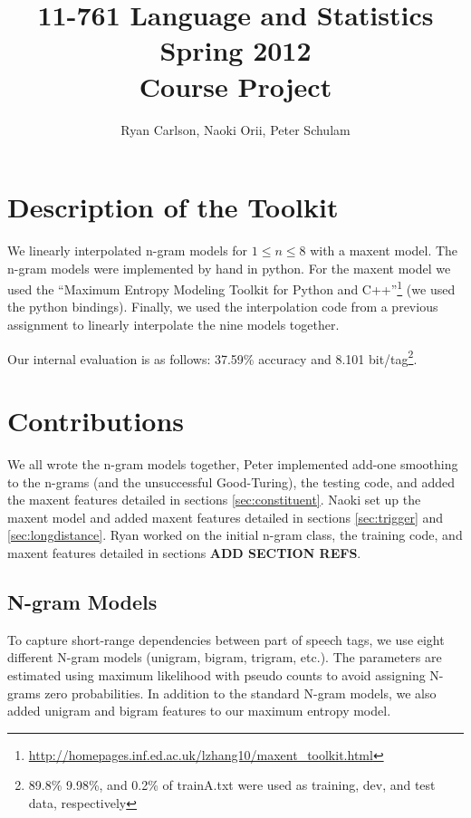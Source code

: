 \documentclass[11pt]{article}
\begin{document}
 

\title{{11-761 Language and Statistics\\Spring 2012\\Course Project}}
\author{Ryan Carlson, Naoki Orii, Peter Schulam}
\maketitle

\section{Description of the Toolkit}

We linearly interpolated n-gram models for $1 \le n \le 8$ with a maxent model. The n-gram models were implemented by hand in python. For the maxent model we used the ``Maximum Entropy Modeling Toolkit for Python and C++''\footnote{\url{http://homepages.inf.ed.ac.uk/lzhang10/maxent_toolkit.html}} (we used the python bindings). Finally, we used the interpolation code from a previous assignment to linearly interpolate the nine models together.

Our internal evaluation is as follows: 37.59\% accuracy and 8.101 bit/tag\footnote{89.8\%  9.98\%, and 0.2\% of trainA.txt were used as training, dev, and test data, respectively}.

\section{Contributions}

We all wrote the n-gram models together, Peter implemented add-one smoothing to the n-grams (and the unsuccessful Good-Turing), the testing code, and added the maxent features detailed in sections \ref{sec:constituent}. Naoki set up the maxent model and added maxent features detailed in sections \ref{sec:trigger} and \ref{sec:longdistance}. Ryan worked on the initial n-gram class, the training code, and maxent features detailed in sections \textbf{ADD SECTION REFS}.

\subsection{N-gram Models}

To capture short-range dependencies between part of speech tags, we use
eight different N-gram models (unigram, bigram, trigram, etc.). The
parameters are estimated using maximum likelihood with pseudo counts to
avoid assigning N-grams zero probabilities. In addition to the standard
N-gram models, we also added unigram and bigram features to our maximum
entropy model. 
\end{document}
